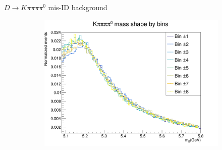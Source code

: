 \documentclass{beamer}
\begin{document}
\begin{frame}{$D\to K\pi\pi\pi\pi^0$ mis-ID background}
\begin{figure}
\begin{subfigure}{0.50\textwidth}
      \includegraphics[width = 1.0\textwidth]{Plots/Kpipipipi0_mass_shape_by_bins.png}
    \end{subfigure}
  \end{figure}
\end{frame}
\end{document}
